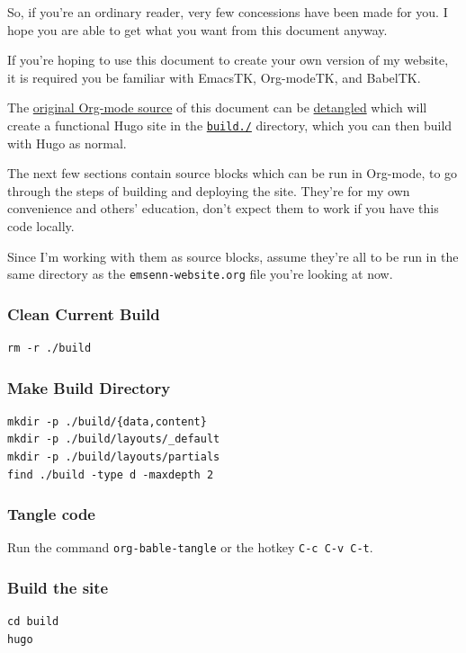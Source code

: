 \documentclass[11pt]{article}
\begin{document}
So, if you're an ordinary reader, very few concessions have been made
for you. I hope you are able to get what you want from this document
anyway.

If you're hoping to use this document to create your own version of my
website, it is required you be familiar with EmacsTK, Org-modeTK, and
BabelTK.

The \href{https://git.sr.ht/\~emsenn/emsenn-net/emsenn-net.org/}{original Org-mode source} of this document can be \href{https://orgmode.org/worg/org-contrib/babel/intro.html\#literate-programming}{detangled} which
will create a functional Hugo site in the \href{./build/}{\texttt{build./}} directory, which
you can then build with Hugo as normal.

The next few sections contain source blocks which can be run in
Org-mode, to go through the steps of building and deploying the site.
They're for my own convenience and others' education, don't expect
them to work if you have this code locally.

Since I'm working with them as source blocks, assume they're all to be
run in the same directory as the \texttt{emsenn-website.org} file you're
looking at now.
\subsubsection{Clean Current Build}
\label{sec:org3329000}
\begin{verbatim}
rm -r ./build
\end{verbatim}
\subsubsection{Make Build Directory}
\label{sec:org3186cb9}
\begin{verbatim}
mkdir -p ./build/{data,content}
mkdir -p ./build/layouts/_default
mkdir -p ./build/layouts/partials
find ./build -type d -maxdepth 2
\end{verbatim}
\subsubsection{Tangle code}
\label{sec:org6c8f2f1}
Run the command \texttt{org-bable-tangle} or the hotkey \texttt{C-c C-v C-t}.
\subsubsection{Build the site}
\label{sec:orgb16c2ad}
\begin{verbatim}
cd build
hugo
\end{verbatim}
\end{document}
